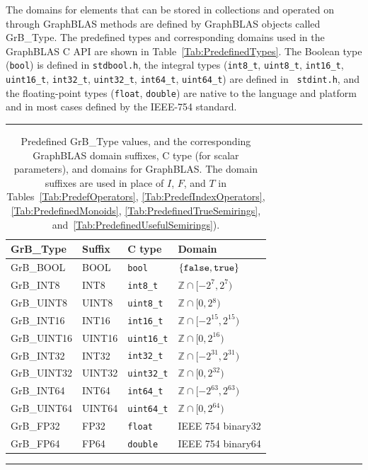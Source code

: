 The domains for elements that can be stored in collections and operated on
through GraphBLAS methods are defined by GraphBLAS objects called {\sf GrB\_Type}.
The predefined types and corresponding domains used in the GraphBLAS C API are
shown in Table~\ref{Tab:PredefinedTypes}.  The Boolean type ({\tt bool})
is defined in {\tt stdbool.h}, the integral types ({\tt int8\_t},
{\tt uint8\_t}, {\tt int16\_t}, {\tt uint16\_t}, {\tt int32\_t},
{\tt uint32\_t}, {\tt int64\_t}, {\tt uint64\_t}) are defined in {\tt
stdint.h}, and the floating-point types ({\tt float}, {\tt double}) are
native to the language and platform and in most cases defined by the 
IEEE-754 standard.

\begin{table}
\hrule
\begin{center}
\caption{Predefined {\sf GrB\_Type} values, and the corresponding GraphBLAS domain 
suffixes, C type (for scalar parameters), and domains for GraphBLAS.  The domain
suffixes are used in place of $I$, $F$, and $T$ in 
Tables~\ref{Tab:PredefOperators}, \ref{Tab:PredefIndexOperators}, 
\ref{Tab:PredefinedMonoids}, \ref{Tab:PredefinedTrueSemirings}, 
and~\ref{Tab:PredefinedUsefulSemirings}).}
\label{Tab:PredefinedTypes}
\label{Tab:PredefinedDomains}

\vspace{1\baselineskip}
\begin{tabular}{l|l|l|l}
{\sf GrB\_Type}   & Suffix       & C type          & Domain \\
\hline
{\sf GrB\_BOOL}   & {\sf BOOL}   & {\tt bool}      & $\{ {\tt false}, {\tt true} \}$  \\
{\sf GrB\_INT8}   & {\sf INT8}   & {\tt int8\_t}   & $\mathbb{Z} \cap [-2^{7},2^{7})$  \\
{\sf GrB\_UINT8}  & {\sf UINT8}  & {\tt uint8\_t}  & $\mathbb{Z} \cap [0,2{^8})$  \\
{\sf GrB\_INT16}  & {\sf INT16}  & {\tt int16\_t}  & $\mathbb{Z} \cap [-2^{15},2^{15})$ \\
{\sf GrB\_UINT16} & {\sf UINT16} & {\tt uint16\_t} & $\mathbb{Z} \cap [0,2^{16})$ \\
{\sf GrB\_INT32}  & {\sf INT32}  & {\tt int32\_t}  & $\mathbb{Z} \cap [-2^{31},2^{31})$ \\
{\sf GrB\_UINT32} & {\sf UINT32} & {\tt uint32\_t} & $\mathbb{Z} \cap [0,2^{32})$ \\
{\sf GrB\_INT64}  & {\sf INT64}  & {\tt int64\_t}  & $\mathbb{Z} \cap [-2^{63},2^{63})$ \\
{\sf GrB\_UINT64} & {\sf UINT64} & {\tt uint64\_t} & $\mathbb{Z} \cap [0,2^{64})$ \\
{\sf GrB\_FP32}   & {\sf FP32}   & {\tt float}     & IEEE 754 {\sf binary32}  \\
{\sf GrB\_FP64}   & {\sf FP64}   & {\tt double}    & IEEE 754 {\sf binary64}  
\end{tabular}
\end{center}
\hrule
\end{table}

